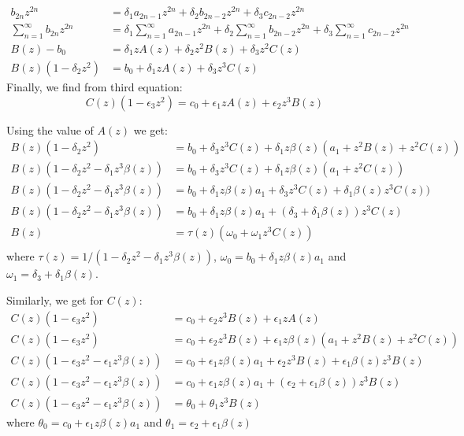 \documentclass[11pt,a4paper]{article}
\begin{document}
\begin{align}
b_{2n}  z^{2n}&= \delta_1 a_{2n-1} z^{2n} + \delta_2 b_{2n-2} z^{2n} +  \delta_3 c_{2n-2} z^{2n}\\
\sum_{n=1}^{\infty} b_{2n}  z^{2n}&=\delta_1   \sum_{n=1}^{\infty}a_{2n-1} z^{2n} + \delta_2  \sum_{n=1}^{\infty}  b_{2n-2} z^{2n} +  \delta_3 \sum_{n=1}^{\infty}c_{2n-2} z^{2n}\\
B(z) -b_0 &=\delta_1  z A(z) + \delta_2 z^2 B(z) + \delta_3 z^2 C(z)\\
B(z)(1 - \delta_2 z^2 )  &=  b_0 + \delta_1  z A(z) +  \delta_3 z^3 C(z)
\end{align}
Finally, we find from third equation:
\begin{equation}
C(z)(1 - \epsilon_3 z^2 )  =  c_0 + \epsilon_1  z A(z) +  \epsilon_2 z^3 B(z)
\end{equation}

Using the value of $A(z)$ we get:
\begin{align*}
B(z)(1 - \delta_2 z^2 )  &=  b_0 + \delta_3 z^3 C(z) +  \delta_1  z   \beta(z) (a_1  +  z^2 B(z) + z^2 C(z)) \\
B(z)(1 - \delta_2 z^2 -\delta_1  z^3   \beta(z) )  &=  b_0 + \delta_3 z^3 C(z) +  \delta_1  z   \beta(z)  (a_1  +   z^2 C(z)) \\
B(z)(1 - \delta_2 z^2 -\delta_1  z^3   \beta(z) )  &=  b_0 +  \delta_1  z   \beta(z)  a_1 + \delta_3 z^3 C(z) +  \delta_1     \beta(z)   z^3 C(z)) \\
B(z)(1 - \delta_2 z^2 -\delta_1  z^3   \beta(z) )  &=  b_0 +  \delta_1  z   \beta(z)  a_1 + (\delta_3 +  \delta_1     \beta(z) )  z^3 C(z) \\
B(z)  &=  \tau(z) ( \omega_0+    \omega_1 z^3 C(z) )\\
\end{align*}
where $\tau(z) = 1/ (1 - \delta_2 z^2 -\delta_1  z^3   \beta(z) )$,  $\omega_0= b_0 +  \delta_1  z   \beta(z)  a_1 $ and $\omega_1= \delta_3 +  \delta_1     \beta(z) $.

Similarly, we get for $C(z)$:
\begin{align*}
C(z)(1 - \epsilon_3 z^2 ) & =  c_0 +   \epsilon_2 z^3 B(z) + \epsilon_1  z A(z)\\
C(z)(1 - \epsilon_3 z^2 )  &=  c_0 +   \epsilon_2 z^3 B(z) + \epsilon_1  z \beta(z) (a_1  +  z^2 B(z) + z^2 C(z))\\
C(z)(1 - \epsilon_3 z^2 - \epsilon_1  z^3   \beta(z))  &=  c_0 +  \epsilon_1  z \beta(z) a_1+  \epsilon_2 z^3 B(z) + \epsilon_1   \beta(z) z^3 B(z) \\
C(z)(1 - \epsilon_3 z^2 - \epsilon_1  z^3   \beta(z))  &=  c_0 +  \epsilon_1  z \beta(z) a_1+  (\epsilon_2 + \epsilon_1   \beta(z)) z^3 B(z)\\
C(z)(1 - \epsilon_3 z^2 - \epsilon_1  z^3   \beta(z))  &=  \theta_0+ \theta_1  z^3 B(z)
\end{align*}
where $\theta_0= c_0 +  \epsilon_1  z \beta(z) a_1$ and $\theta_1= \epsilon_2 + \epsilon_1   \beta(z)$
\end{document}
